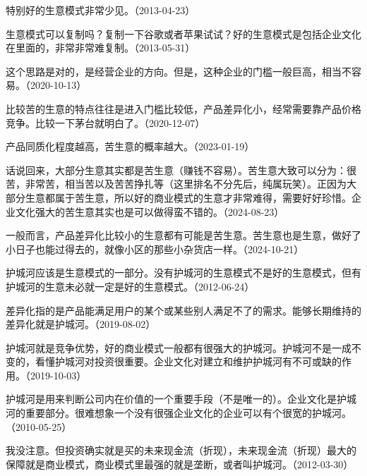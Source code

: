 
特别好的生意模式非常少见。（2013-04-23）


生意模式可以复制吗？复制一下谷歌或者苹果试试？好的生意模式是包括企业文化在里面的，非常非常难复制。（2013-05-31）


这个思路是对的，是经营企业的方向。但是，这种企业的门槛一般巨高，相当不容易。（2020-10-13）

比较苦的生意的特点往往是进入门槛比较低，产品差异化小，经常需要靠产品价格竞争。比较一下茅台就明白了。（2020-12-07）

产品同质化程度越高，苦生意的概率越大。（2023-01-19）

话说回来，大部分生意其实都是苦生意（赚钱不容易）。苦生意大致可以分为：很苦，非常苦，相当苦以及苦苦挣扎等（这里排名不分先后，纯属玩笑）。正因为大部分生意都属于苦生意，所以好的商业模式的生意才非常难得，需要好好珍惜。企业文化强大的苦生意其实也是可以做得蛮不错的。（2024-08-23）

一般而言，产品差异化比较小的生意都有可能是苦生意。苦生意也是生意，做好了小日子也能过得去的，就像小区的那些小杂货店一样。（2024-10-21）


护城河应该是生意模式的一部分。没有护城河的生意模式不是好的生意模式，但有护城河的生意未必就一定是好的生意模式。（2012-06-24）

差异化指的是产品能满足用户的某个或某些别人满足不了的需求。能够长期维持的差异化就是护城河。（2019-08-02）

护城河就是竞争优势，好的商业模式一般都有很强大的护城河。护城河不是一成不变的，看懂护城河对投资很重要。企业文化对建立和维护护城河有不可或缺的作用。（2019-10-03）

护城河是用来判断公司内在价值的一个重要手段（不是唯一的）。企业文化是护城河的重要部分。很难想象一个没有很强企业文化的企业可以有个很宽的护城河。（2010-05-25）


我没注意。但投资确实就是买的未来现金流（折现），未来现金流（折现）最大的保障就是商业模式，商业模式里最强的就是垄断，或者叫护城河。（2012-03-30）

